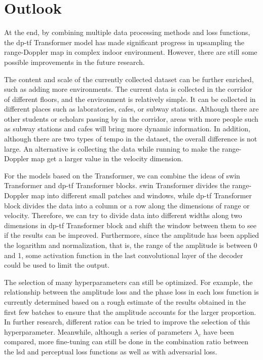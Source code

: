 \section{Outlook} \label{outlook}

At the end, by combining multiple data processing methods and loss functions, the \gls{dp}-\gls{tf} Transformer model has made significant progress in upsampling the range-Doppler map in complex indoor environment. However, there are still some possible improvements in the future research.

The content and scale of the currently collected dataset can be further enriched, such as adding more environments. The current data is collected in the corridor of different floors, and the environment is relatively simple. It can be collected in different places such as laboratories, cafes, or subway stations. Although there are other students or scholars passing by in the corridor, areas with more people such as subway stations and cafes will bring more dynamic information. In addition, although there are two types of tempo in the dataset, the overall difference is not large. An alternative is collecting the data while running to make the range-Doppler map get a larger value in the velocity dimension.

For the models based on the Transformer, we can combine the ideas of \gls{swin} Transformer and \gls{dp}-\gls{tf} Transformer blocks. \gls{swin} Transformer divides the range-Doppler map into different small patches and windows, while \gls{dp}-\gls{tf} Transformer block divides the data into a column or a row along the dimensions of range or velocity. Therefore, we can try to divide data into different widths along two dimensions in \gls{dp}-\gls{tf} Transformer block and shift the window between them to see if the results can be improved. Furthermore, since the amplitude has been applied the logarithm and normalization, that is, the range of the amplitude is between 0 and 1, some activation function in the last convolutional layer of the decoder could be used to limit the output.

The selection of many hyperparameters can still be optimized. For example, the relationship between the amplitude loss and the phase loss in each loss function is currently determined based on a rough estimate of the results obtained in the first few batches to ensure that the amplitude accounts for the larger proportion. In further research, different ratios can be tried to improve the selection of this hyperparameter. Meanwhile, although a series of parameters $\lambda_c$ have been compared, more fine-tuning can still be done in the combination ratio between the \gls{lsd} and perceptual loss functions as well as with adversarial loss.

